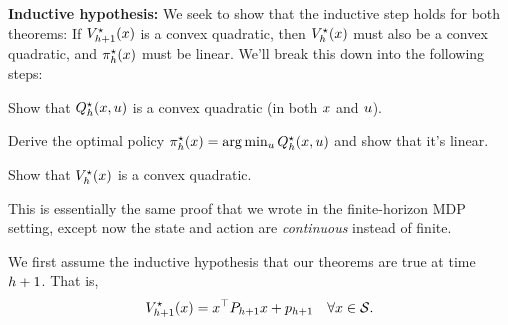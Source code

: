 \documentclass[\main/main]{subfiles}
\begin{document}
\textbf{Inductive hypothesis:} We seek to show that the inductive step holds for both theorems: If $V^\star_{h+1}(x)$ is a convex quadratic, then $V^\star_h(x)$ must also be a convex quadratic, and $\pi^\star_h(x)$ must be linear. We'll break this down into the following steps:
\begin{steps}
    \item Show that $Q^\star_h(x, u)$ is a convex quadratic (in both $x$ and $u$).
    \item Derive the optimal policy $\pi^\star_h(x) = \arg \min_u Q^\star_h(x, u)$ and show that it's linear.
    \item Show that $V^\star_h(x)$ is a convex quadratic.
\end{steps}
This is essentially the same proof that we wrote in the finite-horizon MDP setting,
except now the state and action are \emph{continuous} instead of finite.

We first assume the inductive hypothesis that our theorems are true at time $h+1$. That is,
\[ V^\star_{h+1}(x) = x^\top P_{h+1} x + p_{h+1} \quad \forall x \in \mathcal{S}. \]
\end{document}
